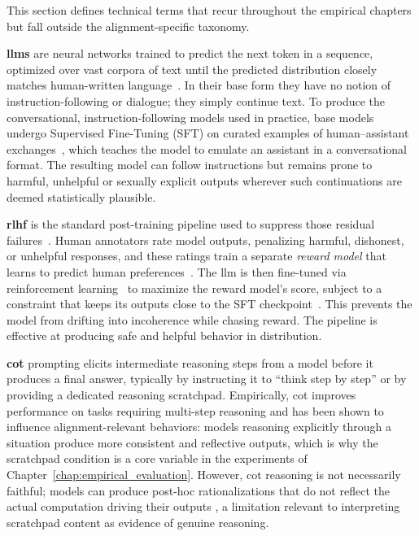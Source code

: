 This section defines technical terms that recur throughout the empirical chapters but fall outside the alignment-specific taxonomy.

\textbf{\glspl{llm}} are neural networks trained to predict the next token in a sequence, optimized over vast corpora of text until the predicted distribution closely matches human-written language~\cite{radford2018improving, brown2020language}. In their base form they have no notion of instruction-following or dialogue; they simply continue text. To produce the conversational, instruction-following models used in practice, base models undergo Supervised Fine-Tuning (SFT) on curated examples of human--assistant exchanges~\cite{ouyang2022training}, which teaches the model to emulate an assistant in a conversational format. The resulting model can follow instructions but remains prone to harmful, unhelpful or sexually explicit outputs wherever such continuations are deemed statistically plausible.

\textbf{\gls{rlhf}} is the standard post-training pipeline used to suppress those residual failures~\cite{ziegler2019fine, stiennon2020learning}. Human annotators rate model outputs, penalizing harmful, dishonest, or unhelpful responses, and these ratings train a separate \textit{reward model} that learns to predict human preferences~\cite{bai2022training}. The \gls{llm} is then fine-tuned via reinforcement learning~\cite{schulman2017proximal} to maximize the reward model's score, subject to a constraint that keeps its outputs close to the SFT checkpoint~\cite{ouyang2022training}. This prevents the model from drifting into incoherence while chasing reward. The pipeline is effective at producing safe and helpful behavior in distribution.

\textbf{\gls{cot}} prompting elicits intermediate reasoning steps from a model before it produces a final answer, typically by instructing it to ``think step by step'' or by providing a dedicated reasoning scratchpad. Empirically, \gls{cot} improves performance on tasks requiring multi-step reasoning \cite{wei2022cot} and has been shown to influence alignment-relevant behaviors: models reasoning explicitly through a situation produce more consistent and reflective outputs, which is why the scratchpad condition is a core variable in the experiments of Chapter~\ref{chap:empirical_evaluation}. However, \gls{cot} reasoning is not necessarily faithful; models can produce post-hoc rationalizations that do not reflect the actual computation driving their outputs \cite{yu2025implicit}, a limitation relevant to interpreting scratchpad content as evidence of genuine reasoning.

